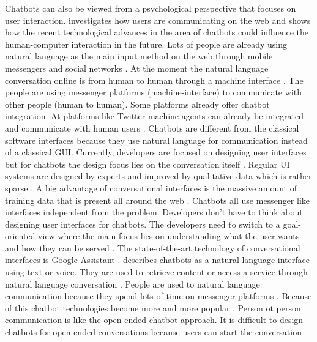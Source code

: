 Chatbots can also be viewed from a psychological perspective that focuses on user interaction.
\citet{folstad2017chatbots} investigates how users are communicating on the web and shows how 
the recent technological advances in the area of chatbots could influence the human-computer interaction in the future.
Lots of people are already using natural language as the main input method on the web through mobile messengers 
and social networks \cite{folstad2017chatbots}. 
At the moment the natural language conversation online is from human to human through a machine interface \cite{folstad2017chatbots}.
The people are using messenger platforms (machine-interface) to communicate with other people (human to human).
Some platforms already offer chatbot integration. 
At platforms like Twitter machine agents can already be integrated and communicate with human users \cite{folstad2017chatbots}. 
Chatbots are different from the classical software interfaces because they use natural language 
for communication instead of a classical GUI.
Currently, developers are focused on designing user interfaces but for chatbots the design focus 
lies on the conversation itself \cite{folstad2017chatbots}. 
Regular UI systems are designed by experts and improved by qualitative data which is rather sparse \cite{folstad2017chatbots}.
A big advantage of conversational interfaces is the massive amount of training data that is present all around the web \cite{folstad2017chatbots}. 
Chatbots all use messenger like interfaces independent from the problem.
Developers don't have to think about designing user interfaces for chatbots.
The developers need to switch to a goal-oriented view where the main focus 
lies on understanding what the user wants and how they can be served \cite{folstad2017chatbots}.
The state-of-the-art technology of conversational interfaces is Google Assistant \cite{folstad2017chatbots}.
\citet{brandtzaeg2018chatbots} describes chatbots as a natural language interface using text or voice.
They are used to retrieve content or access a service through natural language conversation \cite{brandtzaeg2018chatbots}.
People are used to natural language communication because they spend lots of time on messenger platforms \cite{brandtzaeg2018chatbots}.
Because of this chatbot technologies become more and more popular \cite{brandtzaeg2018chatbots}.
Person ot person communication is like the open-ended chatbot approach.
It is difficult to design chatbots for open-ended conversations because users can start the conversation
